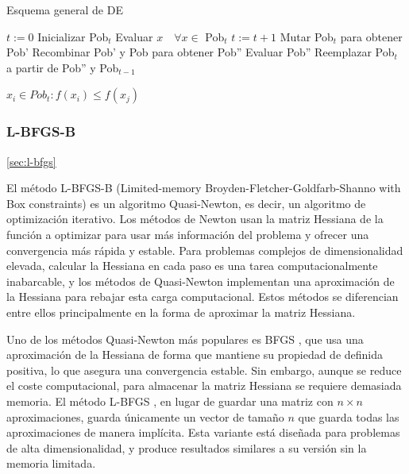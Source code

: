 \begin{algorithm}
\caption{Esquema general de DE}
\label{alg:de}
	\begin{algorithmic}
		\State $t:=0$
		\State Inicializar Pob$_t$
		\State Evaluar $x \quad \forall x \in$ Pob$_t$
			\State $t:=t+1$			
			\State Mutar Pob$_t$ para obtener Pob'
			\State Recombinar Pob' y Pob para obtener Pob'' 
			\State Evaluar Pob''			
			\State Reemplazar Pob$_t$ a partir de Pob'' y Pob$_{t-1}$
		\EndWhile
		
		
		\Return $x_i \in Pob_t : f(x_i)\leq f(x_j)$
	\end{algorithmic}
\end{algorithm}		
		
	

\subsubsection{L-BFGS-B}
\ref{sec:l-bfgs}


El método L-BFGS-B (Limited-memory Broyden-Fletcher-Goldfarb-Shanno with Box constraints) \cite{L-BFGS-B} es un algoritmo Quasi-Newton, es decir, un algoritmo de optimización iterativo. Los métodos de Newton usan la matriz Hessiana de la función a optimizar para usar más información del problema y ofrecer una convergencia más rápida y estable. Para problemas complejos de  dimensionalidad elevada, calcular la Hessiana en cada paso es una tarea computacionalmente inabarcable, y los métodos de Quasi-Newton implementan una aproximación de la Hessiana para rebajar esta carga computacional. Estos métodos se diferencian entre ellos principalmente en la forma de aproximar la matriz Hessiana.

Uno de los métodos Quasi-Newton más populares es BFGS \cite{BFGS}, que usa una aproximación de la Hessiana de forma que mantiene su propiedad de definida positiva, lo que asegura una convergencia estable. Sin embargo, aunque se reduce el coste computacional, para almacenar la matriz Hessiana se requiere demasiada memoria. El método L-BFGS \cite{L-BFGS}, en lugar de guardar una matriz con $n \times n$ aproximaciones, guarda únicamente un vector de tamaño $n$ que guarda todas las aproximaciones de manera implícita. Esta variante está diseñada para problemas de alta dimensionalidad, y produce resultados similares a su versión sin la memoria limitada.

